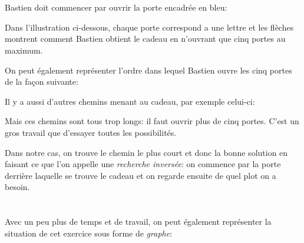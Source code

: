 {{%
\section*{\BrochureSolution}
Bastien doit commencer par ouvrir la porte encadrée en bleu:

{\centering%
\par}

Dans l’illustration ci-dessous, chaque porte correspond a une lettre et les flèches montrent comment Bastien obtient le cadeau en n’ouvrant que cinq portes au maximum.

{\centering%
\par}

On peut également représenter l’ordre dans lequel Bastien ouvre les cinq portes de la façon suivante:

{\centering%
\par}

Il y a aussi d’autres chemins menant au cadeau, par exemple celui-ci:

{\centering%
\par}

Mais ces chemins sont tous trop longs: il faut ouvrir plus de cinq portes. C’est un gros travail que d’essayer toutes les possibilités.

Dans notre cas, on trouve le chemin le plus court et donc la bonne solution en faisant ce que l’on appelle une \emph{recherche inversée}: on commence par la porte derrière laquelle se trouve le cadeau et on regarde ensuite de quel plot on a besoin.



\section*{\BrochureItsInformatics}
Avec un peu plus de temps et de travail, on peut également représenter la situation de cet exercice sous forme de \emph{graphe}:

{\centering%
\par}

}}
